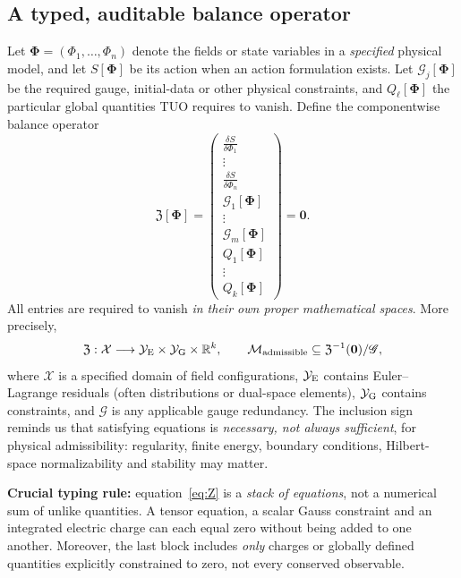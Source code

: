 \documentclass[11pt,a4paper]{article}
\newcommand{\R}{\mathbb{R}}
\newcommand{\cZ}{\mathfrak Z}
\newcommand{\cG}{\mathcal G}
\newcommand{\cX}{\mathcal X}
\newcommand{\cY}{\mathcal Y}
\newcommand{\cM}{\mathcal M}
\theoremstyle{tmon}
\theoremstyle{definition}
\begin{document}
\subsection{A typed, auditable balance operator}
Let $\bm\Phi=(\Phi_1,\ldots,\Phi_n)$ denote the fields or state variables in a \emph{specified} physical model, and let $S[\bm\Phi]$ be its action when an action formulation exists. Let $\cG_j[\bm\Phi]$ be the required gauge, initial-data or other physical constraints, and $Q_\ell[\bm\Phi]$ the particular global quantities TUO requires to vanish. Define the componentwise balance operator
\begin{equation}\label{eq:Z}
\boxed{
\cZ[\bm\Phi]=
\begin{pmatrix}
\displaystyle \frac{\delta S}{\delta\Phi_1}\\[-1pt]
\vdots\\[-1pt]
\displaystyle \frac{\delta S}{\delta\Phi_n}\\[3pt]
\cG_1[\bm\Phi]\\[-1pt]
\vdots\\[-1pt]
\cG_m[\bm\Phi]\\[3pt]
Q_1[\bm\Phi]\\[-1pt]
\vdots\\[-1pt]
Q_k[\bm\Phi]
\end{pmatrix}=\bm 0.
}
\end{equation}
All entries are required to vanish \emph{in their own proper mathematical spaces}. More precisely,
\begin{equation}\label{eq:typed}
\cZ:\cX\longrightarrow
\cY_{\rm E}\times\cY_{\rm G}\times\R^k,
\qquad
\cM_{\rm admissible}\subseteq\cZ^{-1}(\bm 0)/\mathscr G,
\end{equation}
where $\cX$ is a specified domain of field configurations, $\cY_{\rm E}$ contains Euler--Lagrange residuals (often distributions or dual-space elements), $\cY_{\rm G}$ contains constraints, and $\mathscr G$ is any applicable gauge redundancy. The inclusion sign reminds us that satisfying equations is \emph{necessary, not always sufficient}, for physical admissibility: regularity, finite energy, boundary conditions, Hilbert-space normalizability and stability may matter.

\textbf{Crucial typing rule:} equation~\eqref{eq:Z} is a \emph{stack of equations}, not a numerical sum of unlike quantities. A tensor equation, a scalar Gauss constraint and an integrated electric charge can each equal zero without being added to one another. Moreover, the last block includes \emph{only} charges or globally defined quantities explicitly constrained to zero, not every conserved observable.
\end{document}
